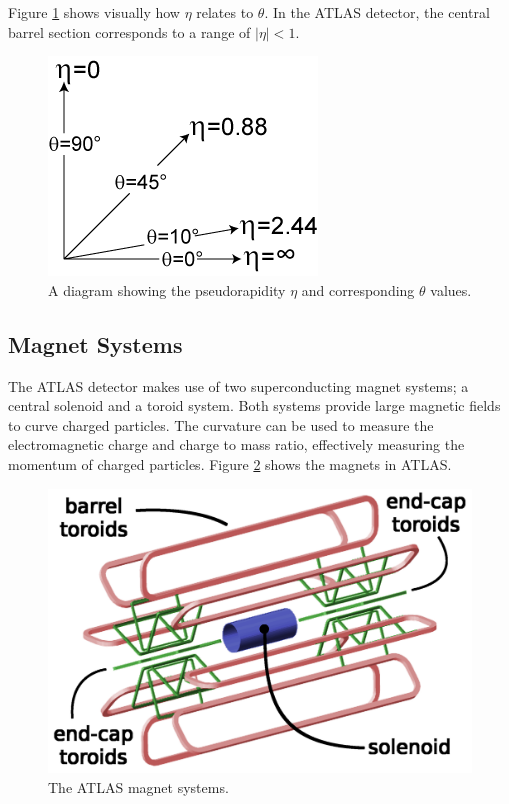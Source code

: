 	Figure \ref{fig:pseudorapidity} shows visually how $\eta$ relates to $\theta$. In the ATLAS detector, the central barrel section corresponds to a range of $|\eta|<1$. 

	\begin{figure}[!ht]
	\centering
	\includegraphics[width=.25\textwidth,keepaspectratio=true]{chapters/chapter2_experiment/images/Pseudorapidity.png}
	\caption{ A diagram showing the pseudorapidity $\eta$ and corresponding $\theta$ values. \cite{pseudorapidity} }
	\label{fig:pseudorapidity}
	\end{figure}

	\subsection{Magnet Systems}\label{ssec:magnets}
	The ATLAS detector makes use of two superconducting magnet systems; a central solenoid and a toroid system. Both systems provide large magnetic fields to curve charged particles. The curvature can be used to measure the electromagnetic charge and charge to mass ratio, effectively measuring the momentum of charged particles. Figure \ref{fig:ATLAS-magnets} shows the magnets in ATLAS.

	\begin{figure}[!ht]
	\centering
	\includegraphics[width=.65\textwidth,keepaspectratio=true]{chapters/chapter2_experiment/images/magnetSystems.png}
	\caption{ The ATLAS magnet systems.}
	\label{fig:ATLAS-magnets}
	\end{figure}

